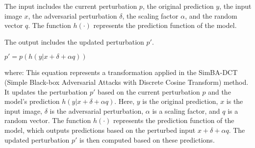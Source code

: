 The input includes the current perturbation $p$, the original prediction $y$, the input image $x$, the adversarial perturbation $\delta$, the scaling factor $\alpha$, and the random vector $q$. The function $h(\cdot)$ represents the prediction function of the model.

The output includes the updated perturbation $p'$.

$p' = p(h(y | x + \delta + \alpha q))$

where:
This equation represents a transformation applied in the SimBA-DCT (Simple Black-box Adversarial Attacks with Discrete Cosine Transform) method. It updates the perturbation $p'$ based on the current perturbation $p$ and the model's prediction $h(y | x + \delta + \alpha q)$. Here, $y$ is the original prediction, $x$ is the input image, $\delta$ is the adversarial perturbation, $\alpha$ is a scaling factor, and $q$ is a random vector. The function $h(\cdot)$ represents the prediction function of the model, which outputs predictions based on the perturbed input $x + \delta + \alpha q$. The updated perturbation $p'$ is then computed based on these predictions.
